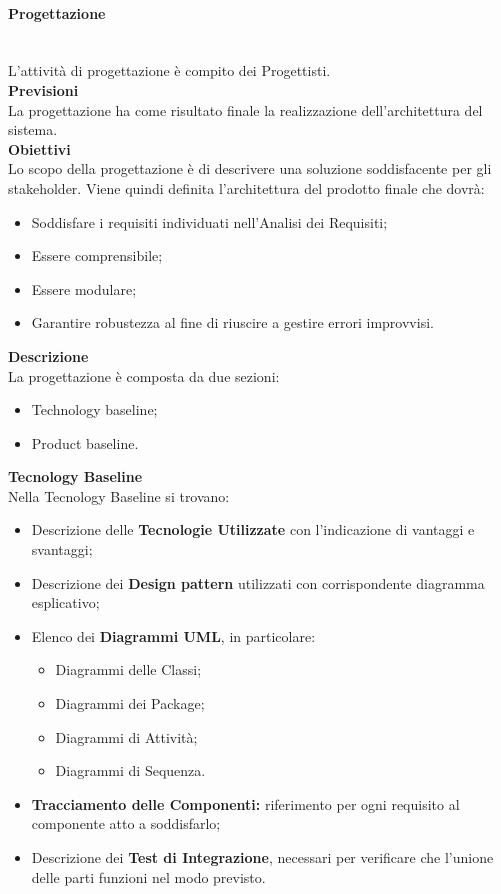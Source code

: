 \paragraph{Progettazione} \mbox{} \\
L'attività di progettazione è compito dei Progettisti.
\\ \textbf{Previsioni}\\
La progettazione ha come risultato finale la realizzazione dell'architettura del sistema.
\\ \textbf{Obiettivi}\\
Lo scopo della progettazione è di descrivere una soluzione soddisfacente per gli stakeholder. 
Viene quindi definita l'architettura del prodotto finale che dovrà:
\begin{itemize}
	\item Soddisfare i requisiti individuati nell'Analisi dei Requisiti;
	\item Essere comprensibile;
	\item Essere modulare;
	\item Garantire robustezza al fine di riuscire a gestire errori improvvisi.
\end{itemize}
\textbf{Descrizione}\\
La progettazione è composta da due sezioni:
\begin{itemize}
	\item Technology baseline;
	\item Product baseline.	
\end{itemize}
\textbf{Tecnology Baseline}\\
Nella Tecnology Baseline si trovano:
\begin{itemize}
	\item Descrizione delle \textbf{Tecnologie Utilizzate} con l'indicazione di vantaggi e svantaggi;
	\item Descrizione dei \textbf{Design pattern} utilizzati con corrispondente diagramma esplicativo;
	\item Elenco dei \textbf{Diagrammi UML}, in particolare:
	\begin{itemize}
		\item Diagrammi delle Classi;
		\item Diagrammi dei Package;
		\item Diagrammi di Attività;
		\item Diagrammi di Sequenza.
	\end{itemize}
	\item \textbf{Tracciamento delle Componenti:} riferimento per ogni requisito al componente atto a soddisfarlo;
	\item Descrizione dei \textbf{Test di Integrazione}, necessari per verificare che l'unione delle parti funzioni nel modo previsto.
\end{itemize}
